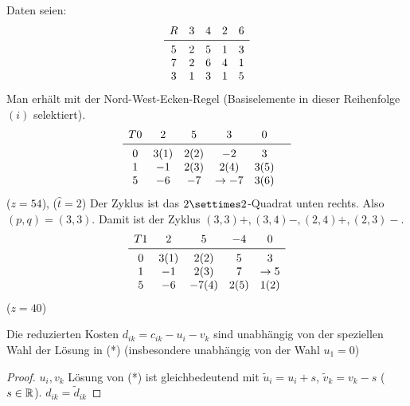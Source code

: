     \begin{example}
            Daten seien:
            $$
            \begin{matrix}
                R & 3 & 4 & 2 & 6 \\
                \midrule
                5 & 2 & 5 & 1 & 3 \\
                7 & 2 & 6 & 4 & 1 \\
                3 & 1 & 3 & 1 & 5
            \end{matrix}
            $$
            Man erhält mit der Nord-West-Ecken-Regel (Basiselemente in dieser Reihenfolge $(i)$ selektiert).
            $$
            \begin{matrix}
                T0 & 2 & 5 & 3 & 0 \\
                \midrule
                0 & 3 (1) & 2 (2) & -2 & 3 & \\
                1 & -1 & 2 (3) & 2 (4) & 3 (5) & \\
                5 & -6 & -7 & \rightarrow -7 & 3 (6)
            \end{matrix}
            $$
            ($z=54$), ($\hat t=2$)
            Der Zyklus ist das $2\settimes 2$-Quadrat unten rechts. Also $(p,q)=(3,3)$.
            Damit ist der Zyklus $(3,3)+,(3,4)-,(2,4)+,(2,3)-$.
            $$
            \begin{matrix}
                T1 & 2 & 5 & -4 & 0\\
                \midrule
                0 & 3(1) & 2(2) & 5 & 3\\
                1 & -1  & 2(3) & 7 & \rightarrow 5 \\
                5 & -6 & -7(4) & 2(5) & 1(2) 
                
            \end{matrix}
            $$
            ($z=40$)
        \end{example}

        \begin{remark}[Optimalitätstest]
            Die reduzierten Kosten $d_{ik}=c_{ik}-u_i-v_k$ sind unabhängig von der speziellen Wahl der Lösung in (*) (insbesondere unabhängig von der Wahl $u_1=0$)
            \begin{proof}
                $u_i,v_k$ Lösung von (*) ist gleichbedeutend mit $\tilde u_i= u_i+s$, $\tilde v_k = v_k -s$ ($s\in \mathbb{R}$). $d_{ik}=\tilde d_{ik}$
            \end{proof}
        \end{remark}

